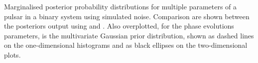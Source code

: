 \label{fig:noise_multiparam}
Marginalised posterior probability distributions for multiple parameters of a pulsar in a binary system using simulated noise. Comparison are shown
between the posteriors output using \lppen and \lppe. Also overplotted, for the phase evolutions parameters, is the multivariate Gaussian prior distribution,
shown as dashed lines on the one-dimensional histograms and as black ellipses on the two-dimensional plots.
